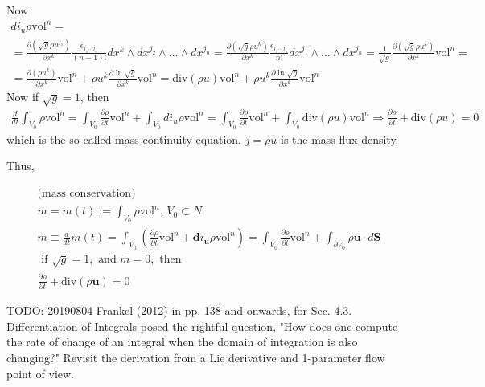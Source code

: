 \documentclass[10pt]{amsart}
\begin{document}
\begin{multicols*}{2}
Now 
\[
\begin{gathered}
di_u \rho \text{vol}^n = \\
= \frac{ \partial ( \sqrt{g} \rho u^{j_1} ) }{ \partial x^k} \frac{ \epsilon_{j_1 \dots j_n} }{ (n-1)! } dx^k \wedge dx^{j_2} \wedge \dots \wedge dx^{j_n} = \frac{ \partial (\sqrt{ g} \rho u^k) }{ \partial x^k} \frac{ \epsilon_{j_1 \dots j_n }}{ n!} dx^{j_1} \wedge \dots \wedge dx^{j_n} = \frac{1}{\sqrt{g}} \frac{ \partial (\sqrt{g} \rho u^k)}{ \partial x^k} \text{vol}^n = \\
= \frac{ \partial (\rho u^k)}{ \partial x^k} \text{vol}^n + \rho u^k \frac{ \partial \ln{ \sqrt{g}}}{ \partial x^k} \text{vol}^n = \text{div}(\rho u) \text{vol}^n + \rho u^k \frac{ \partial \ln{ \sqrt{g}}}{ \partial x^k} \text{vol}^n
\end{gathered}
\]
Now if $\sqrt{g}=1$, then 
\[
\begin{gathered}
\frac{d}{dt} \int_{V_0} \rho \text{vol}^n = \int_{V_0} \frac{ \partial \rho }{ \partial t} \text{vol}^n + \int_{V_0} di_u \rho \text{vol}^n = \int_{V_0} \frac{ \partial \rho }{ \partial t} \text{vol}^n + \int_{V_0} \text{div}(\rho u) \text{vol}^n \Longrightarrow \frac{ \partial \rho}{\partial t} + \text{div}(\rho u) = 0
\end{gathered}
\]
which is the so-called mass continuity equation.  $ j = \rho u$ is the mass flux density.  

Thus,

\begin{equation}
\begin{gathered}
\text{(mass conservation)} \\
m = m(t) := \int_{V_0} \rho \text{vol}^n, \, V_0 \subset N \\
\dot{m} \equiv \frac{d}{dt}m(t) = \int_{V_0} \left( \frac{\partial \rho }{ \partial t} \text{vol}^n + \mathbf{d}i_{\mathbf{u}} \rho \text{vol}^n \right) = \boxed{ \int_{V_0} \frac{ \partial \rho }{ \partial t} \text{vol}^n + \int_{\partial V_0} \rho \mathbf{u} \cdot d\mathbf{S} } \\
\text{ if } \sqrt{g} = 1, \text{ and } \dot{m} = 0, \text{ then } \\
\frac{\partial \rho }{ \partial t} + \text{div}(\rho \mathbf{u}) = 0 
\end{gathered}
\end{equation}

TODO: 20190804 Frankel (2012) \cite{TFrankel2012} in pp. 138 and onwards, for Sec. 4.3. Differentiation of Integrals posed the rightful question, "How does one compute the rate of change of an integral when the domain of integration is also changing?" Revisit the derivation from a Lie derivative and 1-parameter flow point of view.


\end{multicols*}
\end{document}
